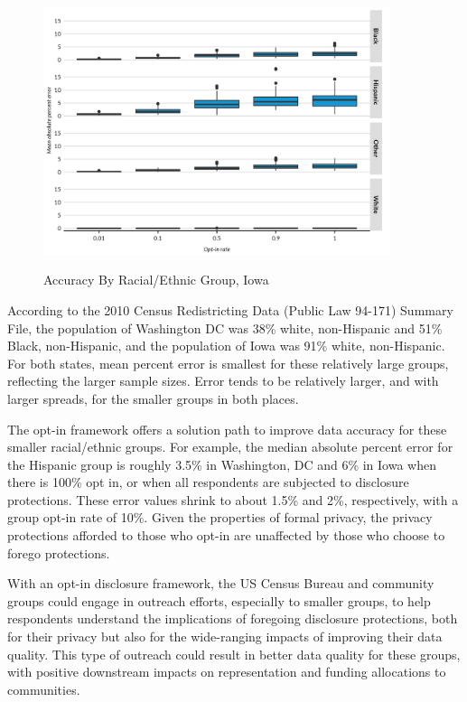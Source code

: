 \documentclass[
]{urban-formatting}
\begin{document}
\begin{figure}[!htb]
    \centering
    \caption{Accuracy By Racial/Ethnic Group, Iowa}
    \includegraphics[width=4in]{../figures/groups_ia.png}
    \label{fig:groups_ia}
\end{figure}

According to the 2010 Census Redistricting Data (Public Law 94-171)
Summary File, the population of Washington DC was 38\% white,
non-Hispanic and 51\% Black, non-Hispanic, and the population of Iowa
was 91\% white, non-Hispanic. For both states, mean percent error is
smallest for these relatively large groups, reflecting the larger sample
sizes. Error tends to be relatively larger, and with larger spreads, for
the smaller groups in both places.

The opt-in framework offers a solution path to improve data accuracy for
these smaller racial/ethnic groups. For example, the median absolute
percent error for the Hispanic group is roughly 3.5\% in Washington, DC
and 6\% in Iowa when there is 100\% opt in, or when all respondents are
subjected to disclosure protections. These error values shrink to about
1.5\% and 2\%, respectively, with a group opt-in rate of 10\%. Given the
properties of formal privacy, the privacy protections afforded to those
who opt-in are unaffected by those who choose to forego protections.

With an opt-in disclosure framework, the US Census Bureau and community
groups could engage in outreach efforts, especially to smaller groups,
to help respondents understand the implications of foregoing disclosure
protections, both for their privacy but also for the wide-ranging
impacts of improving their data quality. This type of outreach could
result in better data quality for these groups, with positive downstream
impacts on representation and funding allocations to communities.~
\end{document}
